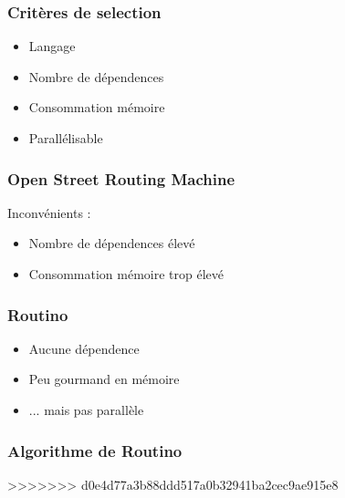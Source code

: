 
\begin{frame}
\frametitle{Critères de selection}
\begin{itemize}
  \item Langage
  \item Nombre de dépendences
  \item Consommation mémoire
  \item Parallélisable
\end{itemize}
\end{frame}


\begin{frame}
\frametitle{Open Street Routing Machine}
Inconvénients :
\begin{itemize}
\item Nombre de dépendences élevé
\item Consommation mémoire trop élevé
\end{itemize}
\end{frame}


\begin{frame}
\frametitle{Routino}
\begin{itemize}
\item Aucune dépendence
\item Peu gourmand en mémoire
\item ... mais pas parallèle
\end{itemize}
\end{frame}



\begin{frame}
\frametitle{Algorithme de Routino}
\begin{itemize}
\end{itemize}
>>>>>>> d0e4d77a3b88ddd517a0b32941ba2cec9ae915e8
\end{frame}
